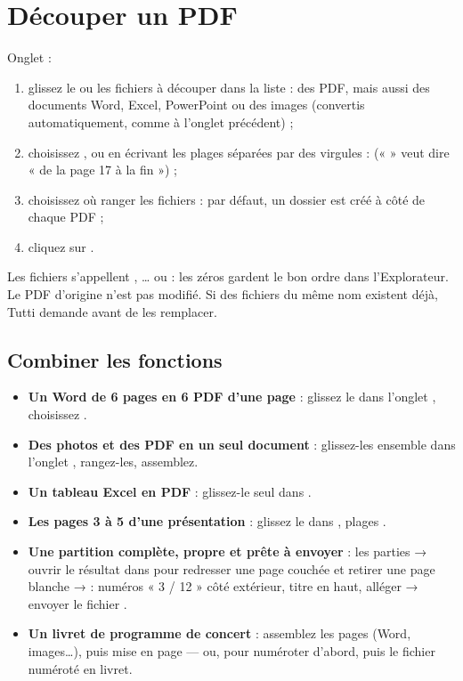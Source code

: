 \section{Découper un PDF}\label{sec:decouper}

Onglet  :
\begin{enumerate}
\item glissez le ou les fichiers à découper dans la liste : des PDF, mais aussi des documents
      Word, Excel, PowerPoint ou des images (convertis automatiquement, comme à l'onglet précédent) ;
\item choisissez , ou  en écrivant les
      plages séparées par des virgules :  («  » veut dire
      « de la page 17 à la fin ») ;
\item choisissez où ranger les fichiers : par défaut, un dossier  est créé
      à côté de chaque PDF ;
\item cliquez sur .
\end{enumerate}
Les fichiers s'appellent , … ou
 : les zéros gardent le bon ordre dans l'Explorateur.
Le PDF d'origine n'est pas modifié. Si des fichiers du même nom existent déjà, Tutti demande
avant de les remplacer.


\subsection*{Combiner les fonctions}
\begin{itemize}
\item \textbf{Un Word de 6 pages en 6 PDF d'une page} : glissez le  dans l'onglet
      , choisissez .
\item \textbf{Des photos et des PDF en un seul document} : glissez-les ensemble dans l'onglet
      , rangez-les, assemblez.
\item \textbf{Un tableau Excel en PDF} : glissez-le seul dans .
\item \textbf{Les pages 3 à 5 d'une présentation} : glissez le  dans
      , plages .
\item \textbf{Une partition complète, propre et prête à envoyer} :
       les parties → ouvrir le résultat dans  pour redresser une page
      couchée et retirer une page blanche →  : numéros « 3 / 12 » côté extérieur,
      titre en haut, \og alléger\fg{} → envoyer le fichier .
\item \textbf{Un livret de programme de concert} : assemblez les pages (Word, images…), puis
      mise en page  — ou, pour numéroter d'abord,  puis
       le fichier numéroté en livret.
\end{itemize}

